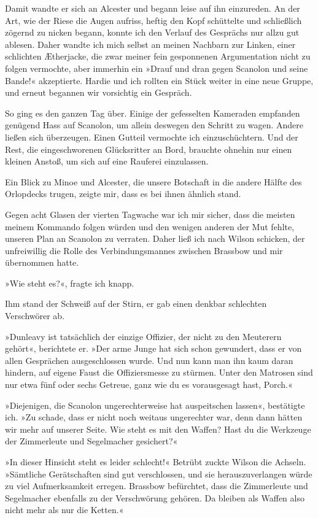 \bigpar

Damit wandte er sich an Alcester und begann leise auf ihn
einzureden. An der Art, wie der Riese die Augen aufriss, heftig den
Kopf schüttelte und schließlich zögernd zu nicken begann, konnte
ich den Verlauf des Gesprächs nur allzu gut ablesen. Daher wandte
ich mich selbst an meinen Nachbarn zur Linken, einer schlichten
Ætherjacke, die zwar meiner fein gesponnenen Argumentation nicht zu
folgen vermochte, aber immerhin ein »Drauf und dran gegen Scanolon
und seine Bande!« akzeptierte. Hardie und ich rollten ein Stück
weiter in eine neue Gruppe, und erneut begannen wir vorsichtig ein
Gespräch.

So ging es den ganzen Tag über. Einige der gefesselten Kameraden
empfanden genügend Hass auf Scanolon, um allein deswegen den
Schritt zu wagen. Andere ließen sich überzeugen. Einen Gutteil
vermochte ich einzuschüchtern. Und der Rest, die eingeschworenen
Glücksritter an Bord, brauchte ohnehin nur einen kleinen Anstoß, um
sich auf eine Rauferei einzulassen.

Ein Blick zu Minoe und Alcester, die unsere Botschaft in die andere
Hälfte des Orlopdecks trugen, zeigte mir, dass es bei ihnen ähnlich
stand.

Gegen acht Glasen der vierten Tagwache war ich mir sicher, dass die
meisten meinem Kommando folgen würden und den wenigen anderen der
Mut fehlte, unseren Plan an Scanolon zu verraten. Daher ließ ich
nach Wilson schicken, der unfreiwillig die Rolle des
Verbindungsmannes zwischen Brassbow und mir übernommen hatte.

»Wie steht es?«, fragte ich knapp.

Ihm stand der Schweiß auf der Stirn, er gab einen denkbar
schlechten Verschwörer ab.

»Dunleavy ist tatsächlich der einzige Offizier, der nicht zu den
Meuterern gehört«, berichtete er. »Der arme Junge hat sich schon
gewundert, dass er von allen Gesprächen ausgeschlossen wurde. Und
nun kann man ihn kaum daran hindern, auf eigene Faust die
Offiziersmesse zu stürmen. Unter den Matrosen sind nur etwa fünf
oder sechs Getreue, ganz wie du es vorausgesagt hast, Porch.«

»Diejenigen, die Scanolon ungerechterweise hat auspeitschen
lassen«, bestätigte ich. »Zu schade, dass er nicht noch weitaus
ungerechter war, denn dann hätten wir mehr auf unserer Seite. Wie
steht es mit den Waffen? Hast du die Werkzeuge der Zimmerleute und
Segelmacher gesichert?«

»In dieser Hinsicht steht es leider schlecht!« Betrübt zuckte
Wilson die Achseln. »Sämtliche Gerätschaften sind gut verschlossen,
und sie herauszuverlangen würde zu viel Aufmerksamkeit erregen.
Brassbow befürchtet, dass die Zimmerleute und Segelmacher ebenfalls
zu der Verschwörung gehören. Da bleiben als Waffen also nicht mehr
als nur die Ketten.«

